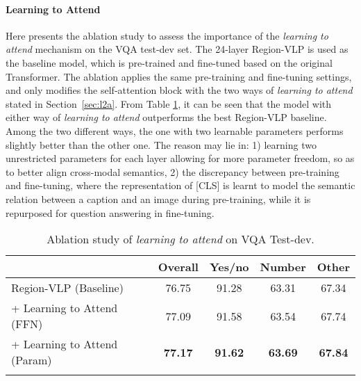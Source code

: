 \paragraph{Learning to Attend}
Here presents the ablation study to assess the importance of the \emph{learning to attend} mechanism on the VQA test-dev set. The 24-layer Region-VLP is used as the baseline model, which is pre-trained and fine-tuned based on the original Transformer. The ablation applies the same pre-training and fine-tuning settings, and only modifies the self-attention block with the two ways of \emph{learning to attend} stated in Section~\ref{sec:l2a}. From Table \ref{table:l2a}, it can be seen that the model with either way of \emph{learning to attend} outperforms the best Region-VLP baseline. Among the two different ways, the one with two learnable parameters performs slightly better than the other one. The reason may lie in: 1) learning two unrestricted parameters for each layer allowing for more parameter freedom, so as to better align cross-modal semantics, 2) the discrepancy between pre-training and fine-tuning, where the representation of [CLS] is learnt to model the semantic relation between a caption and an image during pre-training, while it is repurposed for question answering in fine-tuning.



\begin{table}[b]
\centering
\caption{Ablation study of \emph{learning to attend} on VQA Test-dev.}
\begin{tabular}{lcccc}
\toprule
                  & Overall & Yes/no & Number & Other \\
\midrule
Region-VLP (Baseline)       &   76.75 & 91.28 &  63.31 &  67.34  \\
\quad + Learning to Attend (FFN) &   77.09 &  91.58 &  63.54 & 67.74  \\
\quad + Learning to Attend (Param) &  \textbf{77.17} & \textbf{91.62}  & \textbf{63.69}  &  \textbf{67.84} \\

\bottomrule
\label{table:l2a}
\end{tabular}
\end{table}

